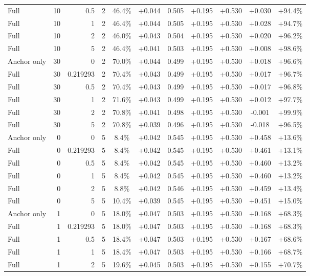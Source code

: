 \begin{table}[htbp]
\begin{tabular}{lrrrccccccc}
Full & 10 & 0.5 & 2 & 46.4\% & +0.044 & 0.505 & +0.195 & +0.530 & +0.030 & +94.4\% \\
Full & 10 & 1 & 2 & 46.4\% & +0.044 & 0.505 & +0.195 & +0.530 & +0.028 & +94.7\% \\
Full & 10 & 2 & 2 & 46.0\% & +0.043 & 0.504 & +0.195 & +0.530 & +0.020 & +96.2\% \\
Full & 10 & 5 & 2 & 46.4\% & +0.041 & 0.503 & +0.195 & +0.530 & +0.008 & +98.6\% \\
Anchor only & 30 & 0 & 2 & 70.0\% & +0.044 & 0.499 & +0.195 & +0.530 & +0.018 & +96.6\% \\
Full & 30 & 0.219293 & 2 & 70.4\% & +0.043 & 0.499 & +0.195 & +0.530 & +0.017 & +96.7\% \\
Full & 30 & 0.5 & 2 & 70.4\% & +0.043 & 0.499 & +0.195 & +0.530 & +0.017 & +96.8\% \\
Full & 30 & 1 & 2 & 71.6\% & +0.043 & 0.499 & +0.195 & +0.530 & +0.012 & +97.7\% \\
Full & 30 & 2 & 2 & 70.8\% & +0.041 & 0.498 & +0.195 & +0.530 & -0.001 & +99.9\% \\
Full & 30 & 5 & 2 & 70.8\% & +0.039 & 0.496 & +0.195 & +0.530 & -0.018 & +96.5\% \\
Anchor only & 0 & 0 & 5 & 8.4\% & +0.042 & 0.545 & +0.195 & +0.530 & +0.458 & +13.6\% \\
Full & 0 & 0.219293 & 5 & 8.4\% & +0.042 & 0.545 & +0.195 & +0.530 & +0.461 & +13.1\% \\
Full & 0 & 0.5 & 5 & 8.4\% & +0.042 & 0.545 & +0.195 & +0.530 & +0.460 & +13.2\% \\
Full & 0 & 1 & 5 & 8.4\% & +0.042 & 0.545 & +0.195 & +0.530 & +0.460 & +13.2\% \\
Full & 0 & 2 & 5 & 8.8\% & +0.042 & 0.546 & +0.195 & +0.530 & +0.459 & +13.4\% \\
Full & 0 & 5 & 5 & 10.4\% & +0.039 & 0.545 & +0.195 & +0.530 & +0.451 & +15.0\% \\
Anchor only & 1 & 0 & 5 & 18.0\% & +0.047 & 0.503 & +0.195 & +0.530 & +0.168 & +68.3\% \\
Full & 1 & 0.219293 & 5 & 18.0\% & +0.047 & 0.503 & +0.195 & +0.530 & +0.168 & +68.3\% \\
Full & 1 & 0.5 & 5 & 18.4\% & +0.047 & 0.503 & +0.195 & +0.530 & +0.167 & +68.6\% \\
Full & 1 & 1 & 5 & 18.4\% & +0.047 & 0.503 & +0.195 & +0.530 & +0.166 & +68.7\% \\
Full & 1 & 2 & 5 & 19.6\% & +0.045 & 0.503 & +0.195 & +0.530 & +0.155 & +70.7\% \\

\end{tabular}
\end{table}
